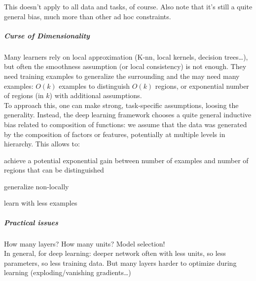\documentclass[10pt]{report}
\begin{document}
This doesn't apply to all data and tasks, of course. Also note that it's still a quite general bias, much more than other ad hoc constraints.
\subparagraph{Curse of Dimensionality} Many learners rely on local approximation (K-nn, local kernels, decision trees\ldots), but often the smoothness assumption (or local consistency) is not enough. They need training examples to generalize the surrounding and the may need many examples: $O(k)$ examples to distinguish $O(k)$ regions, or exponential number of regions (in $k$) with additional assumptions.\\
To approach this, one can make strong, task-specific assumptions, loosing the generality. Instead, the deep learning framework chooses a quite general inductive bias related to composition of functions: we assume that the data was generated by the composition of factors or features, potentially at multiple levels in hierarchy. This allows to:\begin{list}{}{}
	\item achieve a potential exponential gain between number of examples and number of regions that can be distinguished
	\item generalize non-locally
	\item learn with less examples
\end{list}
\subparagraph{Practical issues} How many layers? How many units? Model selection!\\
In general, for deep learning: deeper network often with less units, so less parameters, so less training data. But many layers harder to optimize during learning (exploding/vanishing gradients\ldots)
\end{document}
